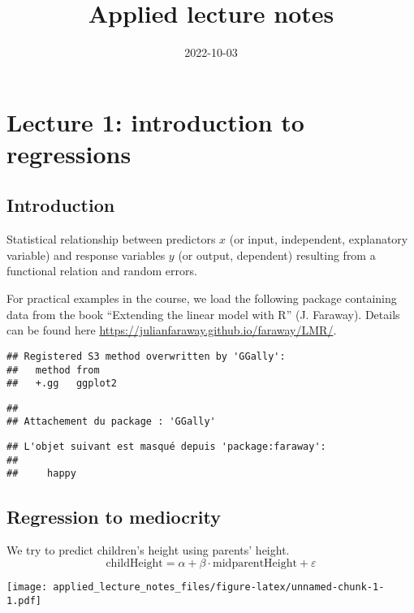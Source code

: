 \documentclass[
]{article}
\title{Applied lecture notes}
\author{}
\date{\vspace{-2.5em}2022-10-03}
\begin{document}
\maketitle

\hypertarget{lecture-1-introduction-to-regressions}{%
\section{Lecture 1: introduction to
regressions}\label{lecture-1-introduction-to-regressions}}

\hypertarget{introduction}{%
\subsection{Introduction}\label{introduction}}

Statistical relationship between predictors \(x\) (or input,
independent, explanatory variable) and response variables \(y\) (or
output, dependent) resulting from a functional relation and random
errors.

For practical examples in the course, we load the following package
containing data from the book ``Extending the linear model with R'' (J.
Faraway). Details can be found here
\url{https://julianfaraway.github.io/faraway/LMR/}.

\begin{verbatim}
## Registered S3 method overwritten by 'GGally':
##   method from   
##   +.gg   ggplot2
\end{verbatim}

\begin{verbatim}
## 
## Attachement du package : 'GGally'
\end{verbatim}

\begin{verbatim}
## L'objet suivant est masqué depuis 'package:faraway':
## 
##     happy
\end{verbatim}

\hypertarget{regression-to-mediocrity}{%
\subsection{Regression to mediocrity}\label{regression-to-mediocrity}}

We try to predict children's height using parents' height.
\[\text{childHeight}=\alpha+\beta\cdot\text{midparentHeight}+\varepsilon\]

\texttt{[image: applied\_lecture\_notes\_files/figure-latex/unnamed-chunk-1-1.pdf]}
\end{document}
